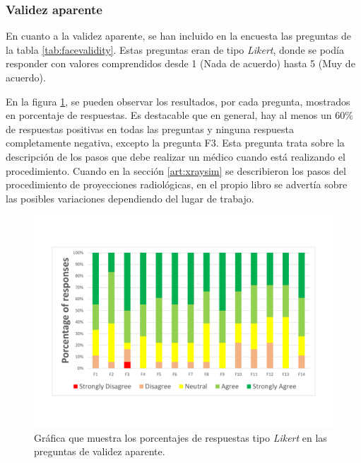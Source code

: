 \subsubsection{Validez aparente}

En cuanto a la validez aparente, se han incluido en la encuesta las preguntas de la tabla \ref{tab:facevalidity}. Estas preguntas eran de tipo \emph{Likert}, donde se podía responder con valores comprendidos desde 1 (Nada de acuerdo) hasta 5 (Muy de acuerdo). 

En la figura \ref{fig:facevalidity}, se pueden observar los resultados, por cada pregunta, mostrados en porcentaje de respuestas. Es destacable que en general, hay al menos un 60\% de respuestas positivas en todas las preguntas y ninguna respuesta completamente negativa, excepto la pregunta F3. Esta pregunta trata sobre la descripción de los pasos que debe realizar un médico cuando está realizando el procedimiento. Cuando en la sección \ref{art:xraysim} se describieron los pasos del procedimiento de proyecciones radiológicas, en el propio libro \cite{manualpractico} se advertía sobre las posibles variaciones dependiendo del lugar de trabajo.  

\begin{figure}[hb]
    \centering
    \includegraphics[trim={15mm 25mm 15mm 25mm},clip,width=0.9\linewidth]{IMG/facevalidty.pdf}
    \caption{Gráfica que muestra los porcentajes de respuestas tipo \emph{Likert} en las preguntas de validez aparente.}
    \label{fig:facevalidity}
\end{figure}



